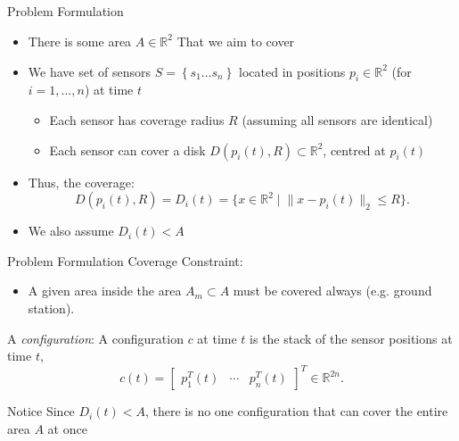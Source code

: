 \documentclass[t]{beamer}
\newcommand{\rR}{\mathbb{R}}
\newcommand{\rsqr}{\mathbb{R}^2}
\newcommand{\bmat}[1]{\begin{bmatrix}#1\end{bmatrix}}
\newcommand{\norm}[1]{\lVert #1 \rVert}
\begin{document}
\subsection[Problem Formulation]{}
\begin{frame}[label=formulation]{Problem Formulation}
\begin{itemize}
\item There is some area $A \in \rR^{2}$ That we aim to cover
\item We have set of sensors $S = \left\{s_1 \ldots s_n\right\}$ located in positions $p_i \in \mathbb{R}^2$ (for $i=1,\ldots,n$) at time $t$
\begin{itemize}
\item Each sensor has coverage radius $R$ (assuming all sensors are identical)
\item Each sensor can cover a disk $D\left(p_{i}\left(t\right), R\right)\subset \rsqr$, centred at $p_{i} \left( t \right)$
\end{itemize}
\item Thus, the coverage: \begin{equation}
D\left(p_{i}\left(t\right),R\right) = D_{i}\left(t\right) = \{ x\in\rsqr \mid \lVert x - p_{i}\left(t\right) \rVert_{2} \leq R \}.
\end{equation}
\item We also assume $D_{i}\left(t\right) < A$
\end{itemize}
\end{frame}

\begin{frame}[label=formulation2]{Problem Formulation}
Coverage Constraint:
\begin{itemize}
\item A given area inside the area $A_{m} \subset A$ must be covered always (e.g. ground station).
\end{itemize}
A \emph{configuration}: A configuration $c$ at time $t$ is the stack of the sensor positions at time $t$,
\begin{equation}
c\left(t\right) = \bmat{
p_{1}^{T}\left(t\right)&\cdots&p_{n}^{T}\left(t\right)}^{T}\in\mathbb{R}^{2n}.
\end{equation}
\begin{block}{Notice}
Since $D_{i}\left( t \right) < A$, there is no one configuration that can cover the entire area $A$ at once
\end{block}
\end{frame}
\end{document}
